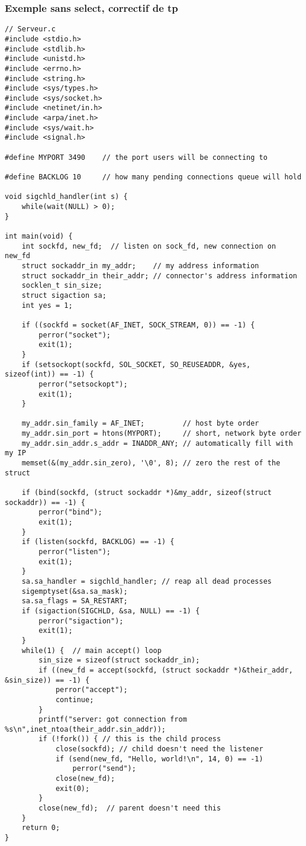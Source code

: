 \documentclass[a4paper]{article}
\begin{document}
\subsubsection{Exemple sans select, correctif de tp}
\begin{lstlisting}
// Serveur.c
#include <stdio.h>
#include <stdlib.h>
#include <unistd.h>
#include <errno.h>
#include <string.h>
#include <sys/types.h>
#include <sys/socket.h>
#include <netinet/in.h>
#include <arpa/inet.h>
#include <sys/wait.h>
#include <signal.h>

#define MYPORT 3490    // the port users will be connecting to

#define BACKLOG 10     // how many pending connections queue will hold

void sigchld_handler(int s) {
    while(wait(NULL) > 0);
}

int main(void) {
    int sockfd, new_fd;  // listen on sock_fd, new connection on new_fd
    struct sockaddr_in my_addr;    // my address information
    struct sockaddr_in their_addr; // connector's address information
    socklen_t sin_size;
    struct sigaction sa;
    int yes = 1;

    if ((sockfd = socket(AF_INET, SOCK_STREAM, 0)) == -1) {
        perror("socket");
        exit(1);
    }
    if (setsockopt(sockfd, SOL_SOCKET, SO_REUSEADDR, &yes, sizeof(int)) == -1) {
        perror("setsockopt");
        exit(1);
    }

    my_addr.sin_family = AF_INET;         // host byte order
    my_addr.sin_port = htons(MYPORT);     // short, network byte order
    my_addr.sin_addr.s_addr = INADDR_ANY; // automatically fill with my IP
    memset(&(my_addr.sin_zero), '\0', 8); // zero the rest of the struct

    if (bind(sockfd, (struct sockaddr *)&my_addr, sizeof(struct sockaddr)) == -1) {
        perror("bind");
        exit(1);
    }
    if (listen(sockfd, BACKLOG) == -1) {
        perror("listen");
        exit(1);
    }
    sa.sa_handler = sigchld_handler; // reap all dead processes
    sigemptyset(&sa.sa_mask);
    sa.sa_flags = SA_RESTART;
    if (sigaction(SIGCHLD, &sa, NULL) == -1) {
        perror("sigaction");
        exit(1);
    }
    while(1) {  // main accept() loop
        sin_size = sizeof(struct sockaddr_in);
        if ((new_fd = accept(sockfd, (struct sockaddr *)&their_addr, &sin_size)) == -1) {
            perror("accept");
            continue;
        }
        printf("server: got connection from %s\n",inet_ntoa(their_addr.sin_addr));
        if (!fork()) { // this is the child process
            close(sockfd); // child doesn't need the listener
            if (send(new_fd, "Hello, world!\n", 14, 0) == -1)
                perror("send");
            close(new_fd);
            exit(0);
        }
        close(new_fd);  // parent doesn't need this
    }
    return 0;
}
\end{lstlisting}
\end{document}
